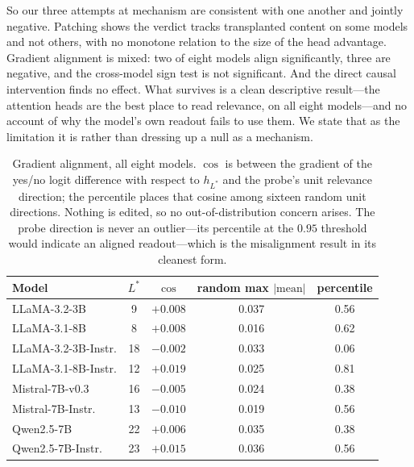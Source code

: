 \documentclass[11pt]{article}
\begin{document}
So our three attempts at mechanism are consistent with one another and jointly
negative. Patching shows the verdict tracks transplanted content on some models
and not others, with no monotone relation to the size of the head advantage.
Gradient alignment is mixed: two of eight models align significantly, three are
negative, and the cross-model sign test is not significant. And the direct causal
intervention finds no effect. What survives is a clean descriptive result---the
attention heads are the best place to read relevance, on all eight models---and
no account of why the model's own readout fails to use them. We state that as the
limitation it is rather than dressing up a null as a mechanism.

\begin{table}[t]
\centering\small
\caption{Gradient alignment, all eight models. $\cos$ is between the gradient of
the yes/no logit difference with respect to $h_{L^*}$ and the probe's unit
relevance direction; the percentile places that cosine among sixteen random unit
directions. Nothing is edited, so no out-of-distribution concern arises. The
probe direction is never an outlier---its percentile at the $0.95$ threshold
would indicate an aligned readout---which is the misalignment result in its
cleanest form.}
\label{tab:grad}
\begin{tabular}{lcccc}
\toprule
Model & $L^*$ & $\cos$ & random max $|\text{mean}|$ & percentile \\
\midrule
LLaMA-3.2-3B        & 9  & $+0.008$ & 0.037 & 0.56 \\
LLaMA-3.1-8B        & 8  & $+0.008$ & 0.016 & 0.62 \\
LLaMA-3.2-3B-Instr. & 18 & $-0.002$ & 0.033 & 0.06 \\
LLaMA-3.1-8B-Instr. & 12 & $+0.019$ & 0.025 & 0.81 \\
Mistral-7B-v0.3     & 16 & $-0.005$ & 0.024 & 0.38 \\
Mistral-7B-Instr.   & 13 & $-0.010$ & 0.019 & 0.56 \\
Qwen2.5-7B          & 22 & $+0.006$ & 0.035 & 0.38 \\
Qwen2.5-7B-Instr.   & 23 & $+0.015$ & 0.036 & 0.56 \\
\bottomrule
\end{tabular}
\end{table}
\end{document}
